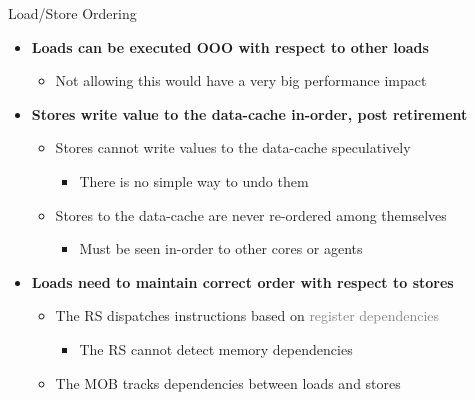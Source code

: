 \documentclass[aspectratio=169,12pt]{beamer}
\begin{document}
\begin{frame}{Load/Store Ordering}
  \begin{itemize}
    \item \textbf{Loads can be executed OOO with respect to other loads}
    \begin{itemize}
      \item Not allowing this would have a very big performance impact
    \end{itemize}
    
    \item \textbf{Stores write value to the data-cache in-order, post retirement}
    \begin{itemize}
      \item Stores cannot write values to the data-cache speculatively
      \begin{itemize}
        \item There is no simple way to undo them
      \end{itemize}
      \item Stores to the data-cache are never re-ordered among themselves
      \begin{itemize}
        \item Must be seen in-order to other cores or agents
      \end{itemize}
    \end{itemize}
    
    \item \textbf{Loads need to maintain correct order with respect to stores}
    \begin{itemize}
      \item The RS dispatches instructions based on \textcolor{gray}{register dependencies}
      \begin{itemize}
        \item The RS cannot detect memory dependencies
      \end{itemize}
      \item The MOB tracks dependencies between loads and stores
    \end{itemize}
  \end{itemize}
\end{frame}
\end{document}
